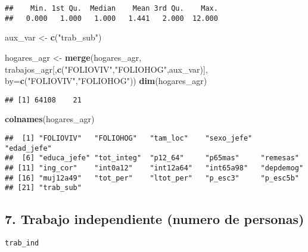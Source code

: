 \documentclass[11pt,]{article}
\newenvironment{Shaded}{\begin{snugshade}}{\end{snugshade}}
\newcommand{\KeywordTok}[1]{\textcolor[rgb]{0.13,0.29,0.53}{\textbf{#1}}}
\newcommand{\DataTypeTok}[1]{\textcolor[rgb]{0.13,0.29,0.53}{#1}}
\newcommand{\StringTok}[1]{\textcolor[rgb]{0.31,0.60,0.02}{#1}}
\newcommand{\CommentTok}[1]{\textcolor[rgb]{0.56,0.35,0.01}{\textit{#1}}}
\newcommand{\OperatorTok}[1]{\textcolor[rgb]{0.81,0.36,0.00}{\textbf{#1}}}
\newcommand{\NormalTok}[1]{#1}
\begin{document}
\begin{verbatim}
##    Min. 1st Qu.  Median    Mean 3rd Qu.    Max. 
##   0.000   1.000   1.000   1.441   2.000  12.000
\end{verbatim}

\begin{Shaded}
\begin{Highlighting}[]
\NormalTok{aux_var <-}\StringTok{ }\KeywordTok{c}\NormalTok{(}\StringTok{"trab_sub"}\NormalTok{)}

\NormalTok{hogares_agr <-}\StringTok{ }\KeywordTok{merge}\NormalTok{(hogares_agr,}
\NormalTok{                     trabajos_agr[,}\KeywordTok{c}\NormalTok{(}\StringTok{"FOLIOVIV"}\NormalTok{,}\StringTok{"FOLIOHOG"}\NormalTok{,aux_var)],}
                     \DataTypeTok{by=}\KeywordTok{c}\NormalTok{(}\StringTok{"FOLIOVIV"}\NormalTok{,}\StringTok{"FOLIOHOG"}\NormalTok{))}
\KeywordTok{dim}\NormalTok{(hogares_agr)}
\end{Highlighting}
\end{Shaded}

\begin{verbatim}
## [1] 64108    21
\end{verbatim}

\begin{Shaded}
\begin{Highlighting}[]
\KeywordTok{colnames}\NormalTok{(hogares_agr)}
\end{Highlighting}
\end{Shaded}

\begin{verbatim}
##  [1] "FOLIOVIV"   "FOLIOHOG"   "tam_loc"    "sexo_jefe"  "edad_jefe" 
##  [6] "educa_jefe" "tot_integ"  "p12_64"     "p65mas"     "remesas"   
## [11] "ing_cor"    "int0a12"    "int12a64"   "int65a98"   "depdemog"  
## [16] "muj12a49"   "tot_per"    "ltot_per"   "p_esc3"     "p_esc5b"   
## [21] "trab_sub"
\end{verbatim}

\subsection{7. Trabajo independiente (numero de
personas)}\label{trabajo-independiente-numero-de-personas}

\texttt{trab\_ind}

\begin{Shaded}
\end{Shaded}
\end{document}
